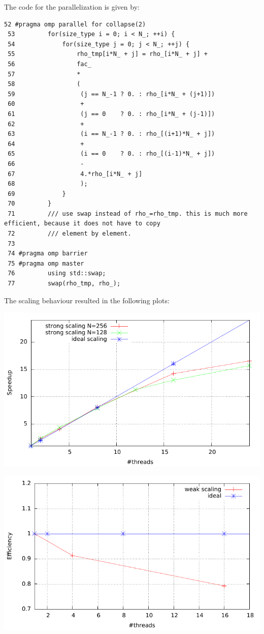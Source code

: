 \documentclass[12pt]{scrbook}
\begin{document}
The code for the parallelization is given by:\\

\begin{lstlisting}[language=CodeBlocks]
 52 #pragma omp parallel for collapse(2)        
 53         for(size_type i = 0; i < N_; ++i) {
 54             for(size_type j = 0; j < N_; ++j) {
 55                 rho_tmp[i*N_ + j] = rho_[i*N_ + j] +
 56                 fac_
 57                 *
 58                 (
 59                  (j == N_-1 ? 0. : rho_[i*N_ + (j+1)])
 60                  +
 61                  (j == 0    ? 0. : rho_[i*N_ + (j-1)])
 62                  +
 63                  (i == N_-1 ? 0. : rho_[(i+1)*N_ + j])
 64                  +
 65                  (i == 0    ? 0. : rho_[(i-1)*N_ + j])
 66                  -
 67                  4.*rho_[i*N_ + j]
 68                  );
 69             }
 70         }
 71         /// use swap instead of rho_=rho_tmp. this is much more efficient, because it does not have to copy
 72         /// element by element.
 73 
 74 #pragma omp barrier
 75 #pragma omp master
 76         using std::swap;
 77         swap(rho_tmp, rho_);
\end{lstlisting}


The scaling behaviour resulted in the following plots: \\
\begin{minipage}[!t]{0.5\textwidth}
\includegraphics[width=\textwidth, keepaspectratio]{strong_scaling.pdf}
\end{minipage}
\begin{minipage}[!t]{0.5	\textwidth}
\includegraphics[width=\textwidth]{weak_scaling.pdf}
\end{minipage}
\end{document}
